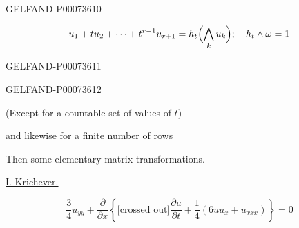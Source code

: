 \begin{GelfandAdjacentEvidence}{GELFAND-P000736}{10}

\[
u_1+tu_2+\cdots+t^{r-1}u_{r+1}
=h_t\Bigl(\bigwedge_k u_k\Bigr);\quad h_t\wedge\omega=1
\]
\end{GelfandAdjacentEvidence}
\begin{GelfandAdjacentEvidence}{GELFAND-P000736}{11}

\end{GelfandAdjacentEvidence}
\begin{GelfandAdjacentEvidence}{GELFAND-P000736}{12}

(Except for a countable set of values of \(t\))

and likewise for a finite number of rows

Then some elementary matrix transformations.

\underline{\underline{I. Krichever.}}

\begin{equation*}
\tag*{(1)\hfill}
\frac34 u_{yy}+\frac{\partial}{\partial x}
\left\{\text{[crossed out]}\frac{\partial u}{\partial t}
+\frac14(6uu_x+u_{xxx})\right\}=0
\end{equation*}
\end{GelfandAdjacentEvidence}



